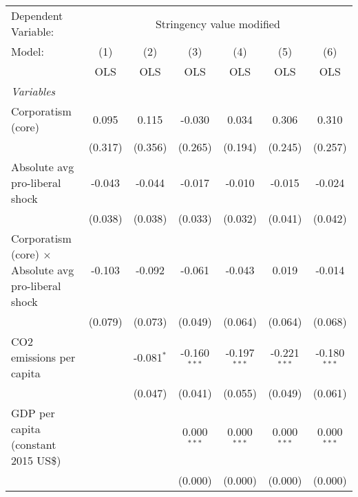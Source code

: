 
\begingroup
\centering
\begin{tabular}{lcccccc}
   \toprule
   Dependent Variable: & \multicolumn{6}{c}{Stringency value modified}\\
   Model:                                                      & (1)     & (2)          & (3)            & (4)            & (5)            & (6)\\  
                                                               &  OLS    & OLS          & OLS            & OLS            & OLS            & OLS\\  
   \midrule
   \emph{Variables}\\
   Corporatism (core)                                          & 0.095   & 0.115        & -0.030         & 0.034          & 0.306          & 0.310\\   
                                                               & (0.317) & (0.356)      & (0.265)        & (0.194)        & (0.245)        & (0.257)\\   
   Absolute avg pro-liberal shock                              & -0.043  & -0.044       & -0.017         & -0.010         & -0.015         & -0.024\\   
                                                               & (0.038) & (0.038)      & (0.033)        & (0.032)        & (0.041)        & (0.042)\\   
   Corporatism (core) $\times$ Absolute avg pro-liberal shock  & -0.103  & -0.092       & -0.061         & -0.043         & 0.019          & -0.014\\   
                                                               & (0.079) & (0.073)      & (0.049)        & (0.064)        & (0.064)        & (0.068)\\   
   CO2 emissions per capita                                    &         & -0.081$^{*}$ & -0.160$^{***}$ & -0.197$^{***}$ & -0.221$^{***}$ & -0.180$^{***}$\\   
                                                               &         & (0.047)      & (0.041)        & (0.055)        & (0.049)        & (0.061)\\   
   GDP per capita (constant 2015 US\$)                         &         &              & 0.000$^{***}$  & 0.000$^{***}$  & 0.000$^{***}$  & 0.000$^{***}$\\   
                                                               &         &              & (0.000)        & (0.000)        & (0.000)        & (0.000)\\   

\end{tabular}
